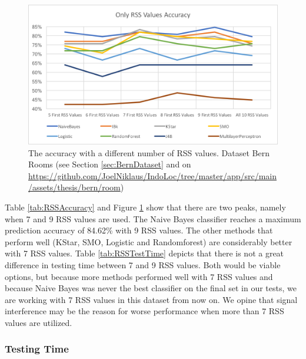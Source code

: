 \begin{figure}[H]
\centering
\includegraphics[width=150mm]{Figures/RssAccuracy.png}
\decoRule
\caption[RSSAccuracy]{The accuracy with a different number of RSS values. Dataset Bern Rooms (see Section \ref{sec:BernDataset} and on \url{https://github.com/JoelNiklaus/IndoLoc/tree/master/app/src/main/assets/thesis/bern/room})}
\label{fig:RSSAccuracy}
\end{figure}



Table \ref{tab:RSSAccuracy} and Figure \ref{fig:RSSAccuracy} show that there are two peaks, namely when 7 and 9 RSS values are used. The Naive Bayes classifier reaches a maximum prediction accuracy of 84.62\% with 9 RSS values. The other methods that perform well (KStar, SMO, Logistic and Randomforest) are considerably better with 7 RSS values. Table \ref{tab:RSSTestTime} depicts that there is not a great difference in testing time between 7 and 9 RSS values. Both would be viable options, but because more methods performed well with 7 RSS values and because Naive Bayes was never the best classifier on the final set in our tests, we are working with 7 RSS values in this dataset from now on.
We opine that signal interference may be the reason for worse performance when more than 7 RSS values are utilized.



\subsubsection{Testing Time}



